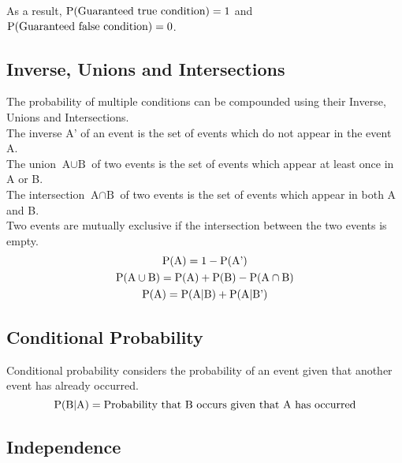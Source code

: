 \documentclass[../main]{subfiles}
\begin{document}
	As a result, \(\operatorname{P}(\text{Guaranteed true condition}) = 1 \) and \(\operatorname{P}(\text{Guaranteed false condition}) = 0 \). \\

	\subsection{Inverse, Unions and Intersections}

	The probability of multiple conditions can be compounded using their Inverse, Unions and Intersections. \\

	The inverse \(\text{A'}\) of an event is the set of events which do not appear in the event A. \\

	The union \(\text{A}\cup\text{B}\) of two events is the set of events which appear at least once in A or B. \\

	The intersection \(\text{A}\cap\text{B}\) of two events is the set of events which appear in both A and B. \\

	Two events are mutually exclusive if the intersection between the two events is empty. \\

	\begin{equation*} \begin{gathered}
		\operatorname{P}(\text{A}) = 1 - \operatorname{P}(\text{A'}) \\
		\operatorname{P}(\text{A}\cup\text{B}) = \operatorname{P}(\text{A}) + \operatorname{P}(\text{B}) - \operatorname{P}(\text{A}\cap\text{B}) \\
		\operatorname{P}(\text{A}) = \operatorname{P}(\text{A}|\text{B}) + \operatorname{P}(\text{A}|\text{B'}) \\
	\end{gathered} \end{equation*}

	\subsection{Conditional Probability}

	Conditional probability considers the probability of an event given that another event has already occurred. \\

	\[\operatorname{P}(\text{B} | \text{A}) = \text{Probability that B occurs given that A has occurred} \]

	\subsection{Independence}
\end{document}
